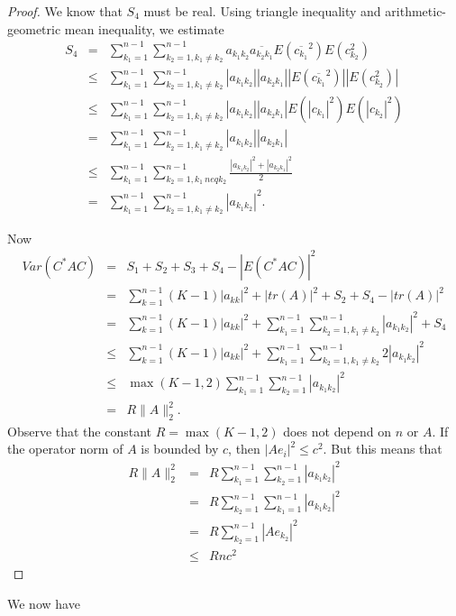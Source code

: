 \documentclass[12pt,a4paper,leqno]{report}
\theoremstyle{plain}
\theoremstyle{definition}
\theoremstyle{remark}
\begin{document}
\begin{proof}
We know that $S_4$ must be real. Using triangle inequality and arithmetic-geometric mean inequality, we estimate
\begin{eqnarray*}
S_4 & = & \sum_{k_1=1}^{n-1}\sum_{k_2=1, k_1 \neq k_2}^{n-1} a_{k_1k_2} \overline{a_{k_2k_1}}
E(\overline{c_{k_1}}^2) E( c_{k_2}^2)\\
& \leq & \sum_{k_1=1}^{n-1}\sum_{k_2=1, k_1 \neq k_2}^{n-1} |a_{k_1k_2}| |a_{k_2k_1}|
|E(\overline{c_{k_1}}^2)| |E( c_{k_2}^2)|\\
& \leq & \sum_{k_1=1}^{n-1}\sum_{k_2=1, k_1 \neq k_2}^{n-1} |a_{k_1k_2}| |a_{k_2k_1}|
E(|c_{k_1}|^2) E(|c_{k_2}|^2)\\
& = & \sum_{k_1=1}^{n-1}\sum_{k_2=1, k_1 \neq k_2}^{n-1} |a_{k_1k_2}| |a_{k_2k_1}|\\
& \leq & \sum_{k_1=1}^{n-1}\sum_{k_2=1, k_1 \ neq k_2}^{n-1} \frac{|a_{k_1k_2}|^2+|a_{k_2k_1}|^2}{2}\\
& = & \sum_{k_1=1}^{n-1}\sum_{k_2=1, k_1 \neq k_2}^{n-1} |a_{k_1k_2}|^2.
\end{eqnarray*}

Now
\begin{eqnarray*}
Var(C^* A C) & = & S_1+S_2+S_3+S_4 - |E(C^* A C)|^2\\
& = & \sum_{k=1}^{n-1} (K-1) |a_{kk}|^2 + |tr(A)|^2 + S_2+S_4 - |tr(A)|^2\\
& = &  \sum_{k=1}^{n-1} (K-1) |a_{kk}|^2 + \sum_{k_1=1}^{n-1} \sum_{k_2=1, k_1\neq k_2}^{n-1} |a_{k_1k_2}|^2+ S_4\\
& \leq & \sum_{k=1}^{n-1} (K-1) |a_{kk}|^2 + \sum_{k_1=1}^{n-1} \sum_{k_2=1, k_1\neq k_2}^{n-1} 2|a_{k_1k_2}|^2\\
& \leq & \max(K-1,2) \sum_{k_1=1}^{n-1} \sum_{k_2=1}^{n-1} |a_{k_1k_2}|^2\\
& = & R \|A\|_2^2. 
\end{eqnarray*}
Observe that the constant $R = \max(K-1,2)$ does not depend on $n$ or $A$. If the operator norm of $A$ is bounded by $c$, then $|Ae_i|^2\leq c^2$. But this means that
\begin{eqnarray*}
R \|A\|_2^2 & = & R \sum_{k_1=1}^{n-1} \sum_{k_2=1}^{n-1} |a_{k_1k_2}|^2\\
& = & R \sum_{k_2=1}^{n-1} \sum_{k_1=1}^{n-1} |a_{k_1k_2}|^2\\
& = & R \sum_{k_2=1}^{n-1} |Ae_{k_2}|^2\\
& \leq & R n c^2
\end{eqnarray*}
\end{proof}

We now have
\end{document}
